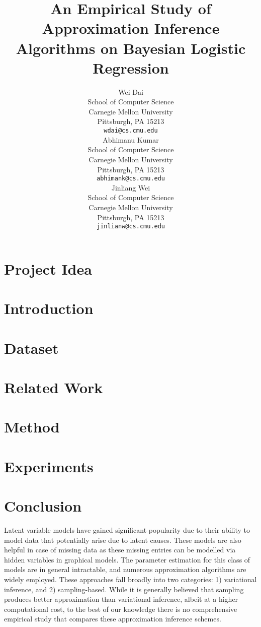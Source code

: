 \documentclass[a4paper, 10pt]{article}
\title{An Empirical Study of Approximation Inference Algorithms on Bayesian Logistic Regression}
\author{
Wei Dai \\
School of Computer Science \\
Carnegie Mellon University\\
Pittsburgh, PA 15213\\
\texttt{wdai@cs.cmu.edu}\\
\And
Abhimanu Kumar \\
School of Computer Science \\
Carnegie Mellon University\\
Pittsburgh, PA 15213\\
\texttt{abhimank@cs.cmu.edu}\\
\And
Jinliang Wei \\
School of Computer Science \\
Carnegie Mellon University\\
Pittsburgh, PA 15213\\
\texttt{jinlianw@cs.cmu.edu}\\
}
\begin{document}
\maketitle

\setcounter{page}{1}
\vspace{-20pt}
\section{Project Idea}
\vspace{-5pt}

\section{Introduction}

\section{Dataset}

\section{Related Work}

\section{Method}

\section{Experiments}

\section{Conclusion}



Latent variable models have gained significant popularity due to their ability to
 model data that potentially arise due to latent causes. These models are also
  helpful in case of missing data as these missing entries can be modelled via 
  hidden variables in graphical models. The parameter estimation for this class 
  of models are in general intractable, and numerous approximation algorithms 
  are widely employed. These approaches fall broadly into two categories: 1) 
  variational inference, and 2) sampling-based. While it is generally believed 
  that sampling produces better approximation than variational inference, albeit 
  at a higher computational cost, to the best of our knowledge there is no 
  comprehensive empirical study that compares these approximation inference schemes.
\end{document}
